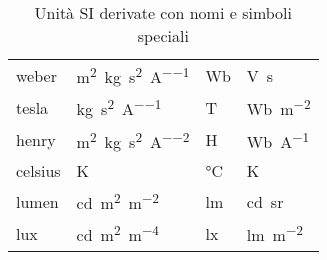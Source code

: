 \begin{table}[ht]
\begin{tabular}{llll}
    weber       & \si{\meter\squared\kilogram\per\second\squared\per\ampere}         & \si{\weber}     & \si{\volt\second}                       \\
    tesla       & \si{\kilogram\per\second\squared\per\ampere}                       & \si{\tesla}     & \si{\weber\per\meter\squared}           \\
    henry       & \si{\meter\squared\kilogram\per\second\squared\per\ampere\squared} & \si{\henry}     & \si{\weber\per\ampere}                  \\
    celsius     & \si{\kelvin}                                                       & \si{\celsius}   & \si{\kelvin}                            \\
    lumen       & \si{\candela\meter\squared\per\meter\squared}                      & \si{\lumen}     & \si{\candela\steradian}                 \\
    lux         & \si{\candela\meter\squared\meter^{-4}}                             & \si{\lux}       & \si{\lumen\per\meter\squared}           \\
    \bottomrule
  \end{tabular}
  \caption{Unità SI derivate con nomi e simboli speciali}
\end{table}

